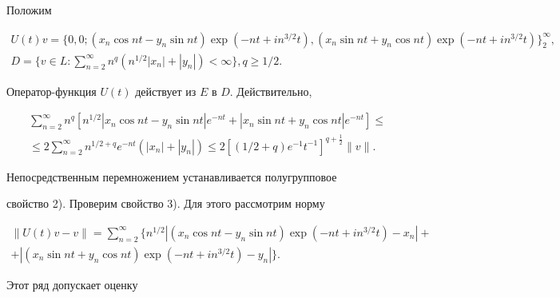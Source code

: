 Положим


\begin{gather*}


U(t)v=\{ 0,0; (x_{n} \cos n t - y_{n} \sin nt) \exp(-nt+in^{3/2}t),


(x_{n} \sin nt + y_{n} \cos nt) \exp(-nt+in^{3/2}t)\}^{\infty}_{2},\\


%


D=\bigg\{v\in L :\sum^{\infty}_{n=2}n^{q} (n^{1/2}|x_{n}|+ |y_{n}|)


< \infty \bigg\}, q \geq1/2.


\end{gather*}





Оператор-функция $U(t)$ действует из $E$ в $D$. Действительно,


\begin{multline*}


\sum^{\infty}_{n=2}n^{q}


[n^{1/2}|x_{n} \cos nt-y_{n} \sin nt| e^{-nt}+


|x_{n} \sin nt + y_{n} \cos nt| e^{-nt}] \leq \\


%


\leq 2\sum^{\infty}_{n=2}n^{1/2+q}e^{-nt}


(|x_{n}|+|y_{n}|)\leq 2 [(1/2+q)


e^{-1}t^{-1}]^{q+\frac{1}{2}} \| v \|.


\end{multline*}





Непосредственным перемножением устанавливается полугрупповое


свойство 2). Проверим свойство 3). Для этого рассмотрим норму


\begin{multline*}


\| U(t)v-v\|=\sum^{\infty}_{n=2}\{n^{1/2}


|(x_{n} \cos nt-y_{n} \sin nt) \exp (-nt+in^{3/2}t)-x_{n}|+ \\


%


+|(x_{n} \sin nt + y_{n} \cos nt)\exp(-nt+in^{3/2}t)-y_{n}|\}.


\end{multline*}


Этот ряд допускает оценку


